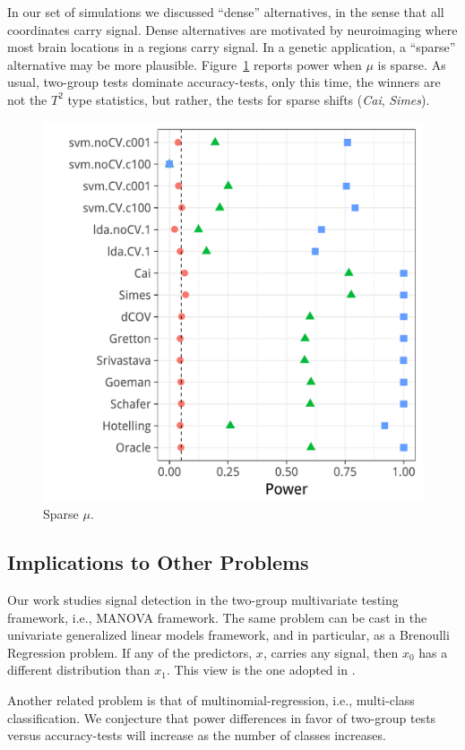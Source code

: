 \documentclass[]{bio}
\begin{document}
In our set of simulations we discussed ``dense'' alternatives, in the sense that all coordinates carry signal.
Dense alternatives are motivated by neuroimaging where most brain locations in a regions carry signal.
In a genetic application, a ``sparse'' alternative may be more plausible. 
Figure~\ref{fig:sparse} reports power when $\mu$ is sparse. 
As usual, two-group tests dominate accuracy-tests, only this time, the winners are not the $T^2$ type statistics, but rather, the tests for sparse shifts (\emph{Cai}, \emph{Simes}).

\begin{figure}[ht]
	\centering
	\centering
	\includegraphics[width=0.7\columnwidth]{"art/file34"}
	\caption{Sparse $\mu$.}  
	\label{fig:sparse}	
\end{figure}



\subsection{Implications to Other Problems}

Our work studies signal detection in the two-group multivariate testing framework, i.e., MANOVA framework.
The same problem can be cast in the univariate generalized linear models framework, and in particular, as a Brenoulli Regression problem.
If any of the predictors, $x$, carries any signal, then $x_0$ has a different distribution than $x_1$.
This view is the one adopted in \cite{goeman2006testing}.

Another related problem is that of multinomial-regression, i.e., multi-class classification.
We conjecture that power differences in favor of two-group tests versus accuracy-tests will increase as the number of classes increases.
\end{document}
